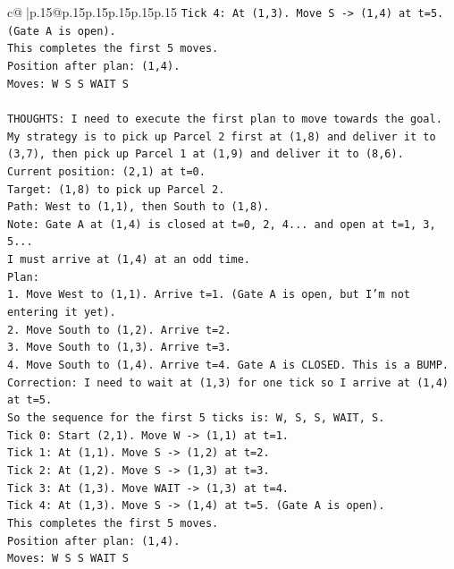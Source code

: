 \documentclass{article}
\begin{document}
{\begin{supertabular}{c@{$\;$}|p{.15\linewidth}@{}p{.15\linewidth}p{.15\linewidth}p{.15\linewidth}p{.15\linewidth}p{.15\linewidth}}
{{{\texttt{Tick 4: At (1,3). Move S {-}> (1,4) at t=5. (Gate A is open).} \\
\texttt{This completes the first 5 moves.} \\
\texttt{Position after plan: (1,4).} \\
\texttt{Moves: W S S WAIT S} \\
\\ 
\texttt{THOUGHTS: I need to execute the first plan to move towards the goal. My strategy is to pick up Parcel 2 first at (1,8) and deliver it to (3,7), then pick up Parcel 1 at (1,9) and deliver it to (8,6).} \\
\texttt{Current position: (2,1) at t=0.} \\
\texttt{Target: (1,8) to pick up Parcel 2.} \\
\texttt{Path: West to (1,1), then South to (1,8).} \\
\texttt{Note: Gate A at (1,4) is closed at t=0, 2, 4... and open at t=1, 3, 5...} \\
\texttt{I must arrive at (1,4) at an odd time.} \\
\texttt{Plan:} \\
\texttt{1. Move West to (1,1). Arrive t=1. (Gate A is open, but I'm not entering it yet).} \\
\texttt{2. Move South to (1,2). Arrive t=2.} \\
\texttt{3. Move South to (1,3). Arrive t=3.} \\
\texttt{4. Move South to (1,4). Arrive t=4. Gate A is CLOSED. This is a BUMP.} \\
\texttt{Correction: I need to wait at (1,3) for one tick so I arrive at (1,4) at t=5.} \\
\texttt{So the sequence for the first 5 ticks is: W, S, S, WAIT, S.} \\
\texttt{Tick 0: Start (2,1). Move W {-}> (1,1) at t=1.} \\
\texttt{Tick 1: At (1,1). Move S {-}> (1,2) at t=2.} \\
\texttt{Tick 2: At (1,2). Move S {-}> (1,3) at t=3.} \\
\texttt{Tick 3: At (1,3). Move WAIT {-}> (1,3) at t=4.} \\
\texttt{Tick 4: At (1,3). Move S {-}> (1,4) at t=5. (Gate A is open).} \\
\texttt{This completes the first 5 moves.} \\
\texttt{Position after plan: (1,4).} \\
\texttt{Moves: W S S WAIT S} \\
}}}
\end{supertabular}}
\end{document}
